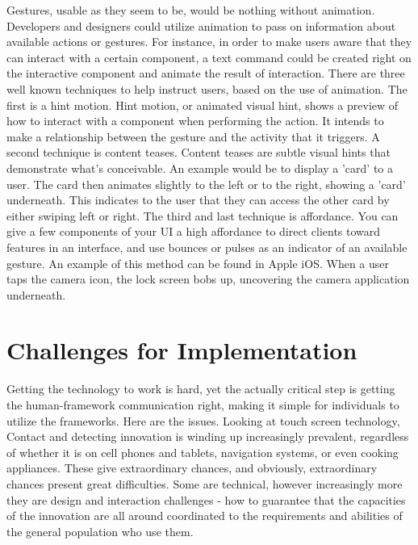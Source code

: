 \documentclass{article}
\begin{document}
Gestures, usable as they seem to be, would be nothing without animation. Developers and designers could utilize animation to pass on information about available actions or gestures. For instance, in order to make users aware that they can interact with a certain component, a text command could be created right on the interactive component and animate the result of interaction. There are three well known techniques to help instruct users, based on the use of animation.\cite{brereton2008new} The first is a hint motion. Hint motion, or animated visual hint, shows a preview of how to interact with a component when performing the action. It intends to make a relationship between the gesture and the activity that it triggers. A second technique is content teases. Content teases are subtle visual hints that demonstrate what's conceivable. An example would be to display a 'card' to a user. The card then animates slightly to the left or to the right, showing a 'card' underneath. This indicates to the user that they can access the other card by either swiping left or right. The third and last technique is affordance. You can give a few components of your UI a high affordance to direct clients toward features in an interface, and use bounces or pulses as an indicator of an available gesture. An example of this method can be found in Apple iOS. When a user taps the camera icon, the lock screen bobs up, uncovering the camera application underneath.

\section{Challenges for Implementation}
Getting the technology to work is hard, yet the actually critical step is getting the human-framework communication right, making it simple for individuals to utilize the frameworks. Here are the issues. Looking at touch screen technology, Contact and detecting innovation is winding up increasingly prevalent, regardless of whether it is on cell phones and tablets, navigation systems, or even cooking appliances. 
These give extraordinary chances, and obviously, extraordinary chances present great difficulties.\cite{khan2012hand} Some are technical, however increasingly more they are design and interaction challenges - how to guarantee that the capacities of the innovation are all around coordinated to the requirements and abilities of the general population who use them. 
\end{document}
